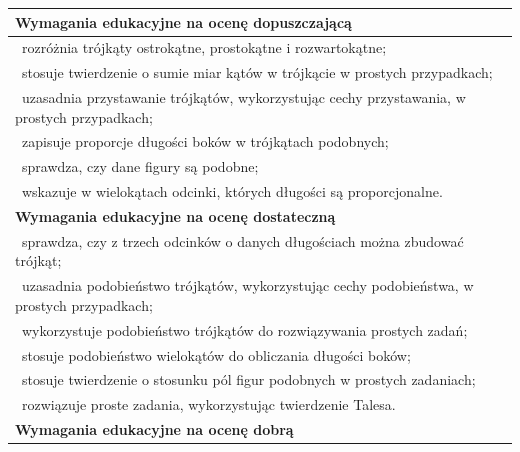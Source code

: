 \documentclass[12pt,a4paper]{article}
\begin{document}
	\begin{longtable}{|p{16cm}|}
		\hline
		
		\textbf{Wymagania edukacyjne na ocenę dopuszczającą} \\ \hline
		
		\textbullet\ rozróżnia trójkąty ostrokątne, prostokątne i rozwartokątne; \\
		
		\textbullet\ stosuje twierdzenie o sumie miar kątów w trójkącie w prostych przypadkach; \\
		
		\textbullet\ uzasadnia przystawanie trójkątów, wykorzystując cechy przystawania, w prostych przypadkach; \\
		
		\textbullet\ zapisuje proporcje długości boków w trójkątach podobnych; \\
		
		\textbullet\ sprawdza, czy dane figury są podobne; \\
		
		\textbullet\ wskazuje w wielokątach odcinki, których długości są proporcjonalne. \\ \hline
		
		\textbf{Wymagania edukacyjne na ocenę dostateczną} \\ \hline
		
		\textbullet\ sprawdza, czy z trzech odcinków o danych długościach można zbudować trójkąt; \\
		
		\textbullet\ uzasadnia podobieństwo trójkątów, wykorzystując cechy podobieństwa, w prostych przypadkach; \\
		
		\textbullet\ wykorzystuje podobieństwo trójkątów do rozwiązywania prostych zadań; \\
		
		\textbullet\ stosuje podobieństwo wielokątów do obliczania długości boków; \\
		
		\textbullet\ stosuje twierdzenie o stosunku pól figur podobnych w prostych zadaniach; \\
		
		\textbullet\ rozwiązuje proste zadania, wykorzystując twierdzenie Talesa. \\ \hline
		
		\textbf{Wymagania edukacyjne na ocenę dobrą} \\ \hline
		

\end{longtable}
\end{document}
